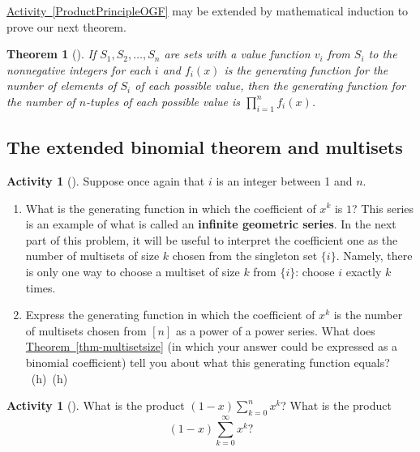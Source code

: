 \documentclass[10pt,]{book}
\newcommand{\terminology}[1]{\textbf{#1}}
\theoremstyle{plain}
\newtheorem{theorem}{Theorem}[section]
\theoremstyle{definition}
\theoremstyle{definition}
\theoremstyle{definition}
\newtheorem{activity}[project]{Activity}
\numberwithin{equation}{chapter}
\begin{document}
\hypertarget{p-1302}{}%
\hyperref[ProductPrincipleOGF]{Activity~\ref{ProductPrincipleOGF}} may be extended by mathematical induction to prove our next theorem.%
\begin{theorem}[{}]\label{theorem-14}
\hypertarget{p-1303}{}%
If \(S_1,S_2,\dots,S_n\) are sets with a value function \(v_i\) from \(S_i\) to the nonnegative integers for each \(i\) and \(f_i(x)\) is the generating function for the number of elements of \(S_i\) of each possible value, then the generating function for the number of \(n\)-tuples of each possible value is \(\prod_{i=1}^n f_i(x)\).%
\end{theorem}
\typeout{************************************************}
\typeout{************************************************}
\subsection[{The extended binomial theorem and multisets}]{The extended binomial theorem and multisets}\label{subsection-35}
\begin{activity}[]\label{activity-243}
\hypertarget{p-1304}{}%
Suppose once again that \(i\) is an integer between 1 and \(n\).%
\begin{enumerate}[font=\bfseries,label=(\alph*),ref=\alph*]
\item\label{task-242} \hypertarget{p-1305}{}%
What is the generating function in which the coefficient of \(x^k\) is \(1\)? This series is an example of what is called an \terminology{infinite geometric series}. In the next part of this problem, it will be useful to interpret the coefficient one as the number of multisets of size \(k\) chosen from the singleton set \(\{i\}\). Namely, there is only one way to choose a multiset of size \(k\) from \(\{i\}\): choose \(i\) exactly \(k\) times.%
\item\label{task-243} \hypertarget{p-1307}{}%
Express the generating function in which the coefficient of \(x^k\) is the number of multisets chosen from \([n]\) as a power of a power series.  What does \hyperref[thm-multisetsize]{Theorem~\ref{thm-multisetsize}} (in which your answer could be expressed as a binomial coefficient) tell you about what this generating function equals?%
~{\tiny (h)}~{\tiny (h)}\end{enumerate}
\end{activity}
\begin{activity}[]\label{activity-244}
\hypertarget{p-1311}{}%
What is the product \((1-x)\sum_{k=0}^n x^k\)? What is the product%
\begin{equation*}
(1-x)\sum_{k=0}^\infty x^k?
\end{equation*}
%
\end{activity}
\end{document}
